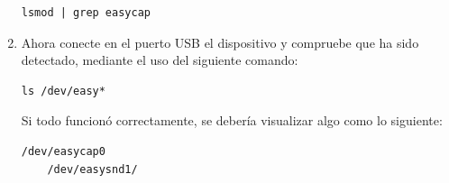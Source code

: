 \begin{enumerate}
  \begin{lstlisting}[style=consola]
    lsmod | grep easycap
  \end{lstlisting} 
  
\item Ahora conecte en el puerto USB el dispositivo y compruebe que ha sido detectado, mediante el uso del siguiente comando:
  \begin{lstlisting}[style=consola]
ls /dev/easy*
  \end{lstlisting}
  
  Si todo funcionó correctamente, se debería visualizar algo como lo siguiente:
  \begin{lstlisting}[style=consola]
    /dev/easycap0
    /dev/easysnd1/
  \end{lstlisting}
  
\end{enumerate}

